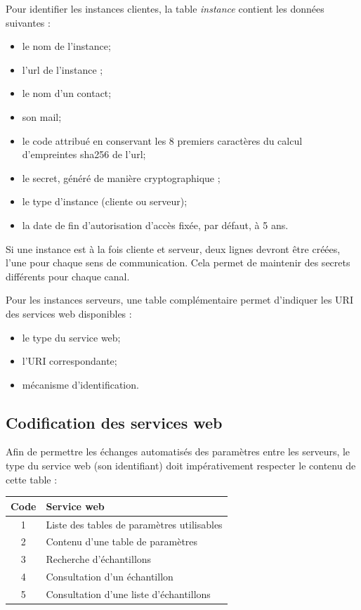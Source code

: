 Pour identifier les instances clientes, la table \textit{instance} contient les données suivantes :
\begin{itemize}
\item le nom de l'instance;
\item l'url de l'instance ;
\item le nom d'un contact;
\item son mail;
\item le code attribué en conservant les 8 premiers caractères du calcul d'empreintes sha256 de l'url;
\item le secret, généré de manière cryptographique ;
\item le type d'instance (cliente ou serveur);
\item la date de fin d'autorisation d'accès fixée, par défaut, à 5 ans.
\end{itemize}

Si une instance est à la fois cliente et serveur, deux lignes devront être créées, l'une pour chaque sens de communication. Cela permet de maintenir des secrets différents pour chaque canal.

Pour les instances \og serveurs\fg{}, une table complémentaire permet d'indiquer les URI des services web disponibles :
\begin{itemize}
\item le type du service web;
\item l'URI correspondante;
\item mécanisme d'identification.
\end{itemize}

\subsection{Codification des services web}
Afin de permettre les échanges automatisés des paramètres entre les serveurs, le type du service web (son identifiant) doit impérativement respecter le contenu de cette table :
\begin{longtable}{|c|>{\raggedright\arraybackslash}p{10cm}|}
\hline 
Code & Service web  \\ 
\hline \endhead
1 & Liste des tables de paramètres utilisables \\
\hline
2 & Contenu d'une table de paramètres \\
\hline
3 & Recherche d'échantillons \\
\hline
4 & Consultation d'un échantillon \\
\hline
5 & Consultation d'une liste d'échantillons\\
\hline

\end{longtable}

